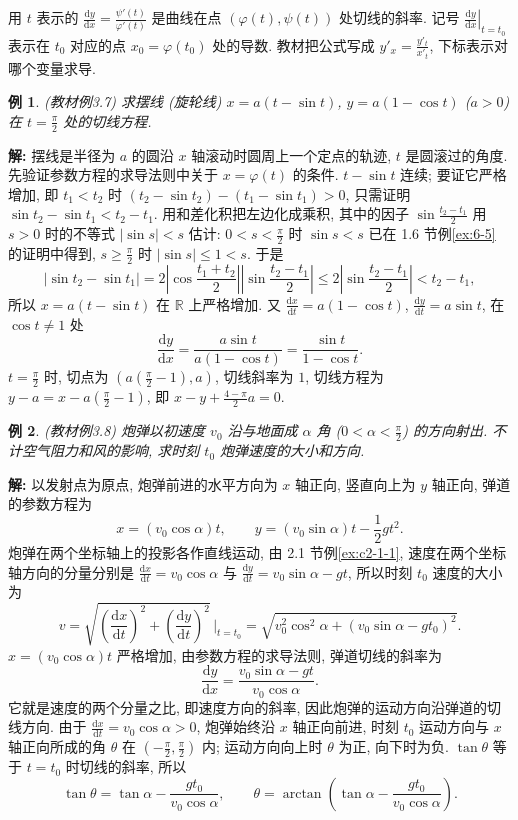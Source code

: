 \documentclass[UTF8,openany]{ctexbook}
\theoremstyle{chinesetextbook}
\newtheorem{example}{例}[section]
\newenvironment{cnsolution}{\par\indent\textbf{解:} \ignorespaces}{\par}
\newcommand{\dd}{\mathrm d}
\begin{document}
用 $t$ 表示的 $\displaystyle\frac{\dd y}{\dd x}=\frac{\psi'(t)}{\varphi'(t)}$ 是曲线在点 $(\varphi(t),\psi(t))$ 处切线的斜率. 记号 $\displaystyle\left.\frac{\dd y}{\dd x}\right|_{t=t_0}$ 表示在 $t_0$ 对应的点 $x_0=\varphi(t_0)$ 处的导数. 教材把公式写成 $\displaystyle y'_x=\frac{y'_t}{x'_t}$, 下标表示对哪个变量求导.
\begin{example}\label{ex:c2-3-7}
\textnormal{(教材例3.7)} 求摆线 (旋轮线) $x=a(t-\sin t)$, $y=a(1-\cos t)$ ($a>0$) 在 $\displaystyle t=\frac\pi2$ 处的切线方程.
\end{example}
\begin{cnsolution}
摆线是半径为 $a$ 的圆沿 $x$ 轴滚动时圆周上一个定点的轨迹, $t$ 是圆滚过的角度. 先验证参数方程的求导法则中关于 $x=\varphi(t)$ 的条件. $t-\sin t$ 连续; 要证它严格增加, 即 $t_1<t_2$ 时 $(t_2-\sin t_2)-(t_1-\sin t_1)>0$, 只需证明 $\sin t_2-\sin t_1<t_2-t_1$. 用和差化积把左边化成乘积, 其中的因子 $\displaystyle\sin\frac{t_2-t_1}2$ 用 $s>0$ 时的不等式 $|\sin s|<s$ 估计: $\displaystyle0<s<\frac\pi2$ 时 $\sin s<s$ 已在 1.6 节例\ref{ex:6-5} 的证明中得到, $\displaystyle s\ge\frac\pi2$ 时 $|\sin s|\le1<s$. 于是
\[
|\sin t_2-\sin t_1|=2\left|\cos\frac{t_1+t_2}2\right|\left|\sin\frac{t_2-t_1}2\right|\le2\left|\sin\frac{t_2-t_1}2\right|<t_2-t_1,
\]
所以 $x=a(t-\sin t)$ 在 $\mathbb R$ 上严格增加. 又 $\displaystyle\frac{\dd x}{\dd t}=a(1-\cos t)$, $\displaystyle\frac{\dd y}{\dd t}=a\sin t$, 在 $\cos t\ne1$ 处
\[
\frac{\dd y}{\dd x}=\frac{a\sin t}{a(1-\cos t)}=\frac{\sin t}{1-\cos t}.
\]
$\displaystyle t=\frac\pi2$ 时, 切点为 $\displaystyle\left(a\left(\frac\pi2-1\right),a\right)$, 切线斜率为 $1$, 切线方程为 $\displaystyle y-a=x-a\left(\frac\pi2-1\right)$, 即 $\displaystyle x-y+\frac{4-\pi}2a=0$.
\end{cnsolution}
\begin{example}\label{ex:c2-3-8}
\textnormal{(教材例3.8)} 炮弹以初速度 $v_0$ 沿与地面成 $\alpha$ 角 ($\displaystyle0<\alpha<\frac\pi2$) 的方向射出. 不计空气阻力和风的影响, 求时刻 $t_0$ 炮弹速度的大小和方向.
\end{example}
\begin{cnsolution}
以发射点为原点, 炮弹前进的水平方向为 $x$ 轴正向, 竖直向上为 $y$ 轴正向, 弹道的参数方程为
\[
x=(v_0\cos\alpha)t,\qquad y=(v_0\sin\alpha)t-\frac12gt^2.
\]
炮弹在两个坐标轴上的投影各作直线运动, 由 2.1 节例\ref{ex:c2-1-1}, 速度在两个坐标轴方向的分量分别是 $\displaystyle\frac{\dd x}{\dd t}=v_0\cos\alpha$ 与 $\displaystyle\frac{\dd y}{\dd t}=v_0\sin\alpha-gt$, 所以时刻 $t_0$ 速度的大小为
\[
v=\sqrt{\left(\frac{\dd x}{\dd t}\right)^2+\left(\frac{\dd y}{\dd t}\right)^2}\,\Bigg|_{t=t_0}=\sqrt{v_0^2\cos^2\alpha+(v_0\sin\alpha-gt_0)^2}.
\]
$x=(v_0\cos\alpha)t$ 严格增加, 由参数方程的求导法则, 弹道切线的斜率为
\[
\frac{\dd y}{\dd x}=\frac{v_0\sin\alpha-gt}{v_0\cos\alpha}.
\]
它就是速度的两个分量之比, 即速度方向的斜率, 因此炮弹的运动方向沿弹道的切线方向. 由于 $\displaystyle\frac{\dd x}{\dd t}=v_0\cos\alpha>0$, 炮弹始终沿 $x$ 轴正向前进, 时刻 $t_0$ 运动方向与 $x$ 轴正向所成的角 $\theta$ 在 $\displaystyle\left(-\frac\pi2,\frac\pi2\right)$ 内; 运动方向向上时 $\theta$ 为正, 向下时为负. $\tan\theta$ 等于 $t=t_0$ 时切线的斜率, 所以
\[
\tan\theta=\tan\alpha-\frac{gt_0}{v_0\cos\alpha},\qquad\theta=\arctan\left(\tan\alpha-\frac{gt_0}{v_0\cos\alpha}\right).
\]

\end{cnsolution}
\end{document}
